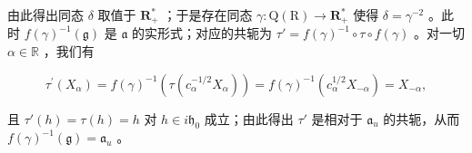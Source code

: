 由此得出同态 \(\delta\) 取值于 \(\mathbf{R}_+^*\) ；于是存在同态 \(\gamma : \mathrm{Q}(\mathrm{R}) \to \mathbf{R}_+^*\) 使得 \(\delta = \gamma^{-2}\) 。此时 \(f(\gamma)^{-1}(\mathfrak{g})\) 是 \(\mathfrak{a}\) 的实形式；对应的共轭为 \(\tau' = f(\gamma)^{-1} \circ \tau \circ f(\gamma)\) 。对一切 \(\alpha \in \mathbb{R}\) ，我们有

\[
\tau^ {\prime} (X _ {\alpha}) = f (\gamma) ^ {- 1} (\tau (c _ {\alpha} ^ {- 1 / 2} X _ {\alpha})) = f (\gamma) ^ {- 1} (c _ {\alpha} ^ {1 / 2} X _ {- \alpha}) = X _ {- \alpha},
\]

且 \(\tau'(h) = \tau(h) = h\) 对 \(h \in i\mathfrak{h}_0\) 成立；由此得出 \(\tau'\) 是相对于 \(\mathfrak{a}_u\) 的共轭，从而 \(f(\gamma)^{-1}(\mathfrak{g}) = \mathfrak{a}_u\) 。

